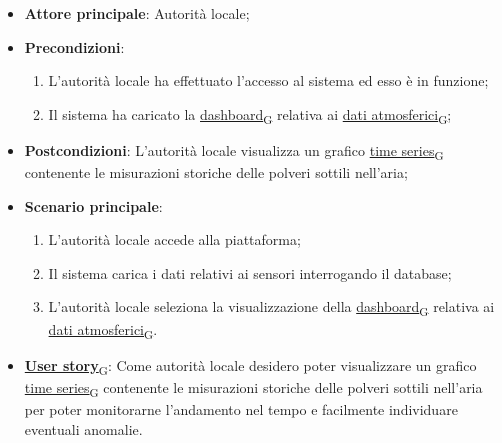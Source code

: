 \begin{itemize}
	\item \textbf{Attore principale}: Autorità locale;
	\item \textbf{Precondizioni}:
	      \begin{enumerate}
		      \item L'autorità locale ha effettuato l'accesso al sistema ed esso è in funzione;
		      \item Il sistema ha caricato la \href{https://7last.github.io/docs/rtb/documentazione-interna/glossario\#dashboard}{dashboard\textsubscript{G}} relativa ai \href{https://7last.github.io/docs/rtb/documentazione-interna/glossario\#dati-atmosferici}{dati atmosferici\textsubscript{G}};
	      \end{enumerate}
	\item \textbf{Postcondizioni}: L'autorità locale visualizza un grafico \href{https://7last.github.io/docs/rtb/documentazione-interna/glossario\#time-series}{time series\textsubscript{G}} contenente le misurazioni storiche
	      delle polveri sottili nell'aria;
	\item \textbf{Scenario principale}:
	      \begin{enumerate}
		      \item L'autorità locale accede alla piattaforma;
		      \item Il sistema carica i dati relativi ai sensori interrogando il database;
		      \item L'autorità locale seleziona la visualizzazione della \href{https://7last.github.io/docs/rtb/documentazione-interna/glossario\#dashboard}{dashboard\textsubscript{G}} relativa ai \href{https://7last.github.io/docs/rtb/documentazione-interna/glossario\#dati-atmosferici}{dati atmosferici\textsubscript{G}}.
	      \end{enumerate}
	\item \href{https://7last.github.io/docs/rtb/documentazione-interna/glossario\#user-story}{\textbf{User story}\textsubscript{G}}: Come autorità locale desidero poter visualizzare un grafico \href{https://7last.github.io/docs/rtb/documentazione-interna/glossario\#time-series}{time series\textsubscript{G}} contenente le misurazioni storiche delle polveri sottili nell'aria
	      per poter monitorarne l'andamento nel tempo e facilmente individuare eventuali anomalie.
\end{itemize}

